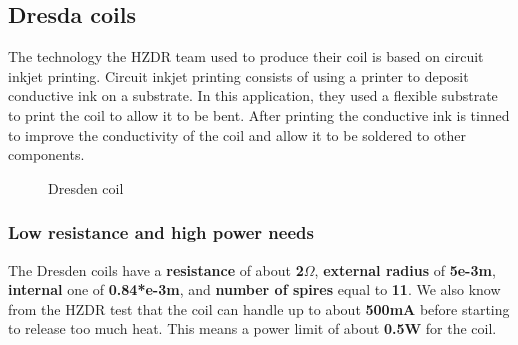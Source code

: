 \subsection{Dresda coils}
The technology the HZDR team used to produce their coil is based on circuit inkjet printing.
Circuit inkjet printing consists of using a printer to deposit conductive ink on a substrate.
In this application, they used a flexible substrate to print the coil to allow it to be bent.
After printing the conductive ink is tinned to improve the conductivity of the coil and allow it to be soldered to other components.
\begin{figure}
    \centering
    \caption{Dresden coil \cite{HZDR}}
    \label{fig:Dresden_coil}
\end{figure}

\subsubsection{Low resistance and high power needs}
The Dresden coils have a \textbf{resistance} of about \textbf{2$\Omega$}, \textbf{external radius} of \textbf{5e-3m}, \textbf{internal} one of \textbf{0.84*e-3m}, and \textbf{number of spires} equal to \textbf{11}.
We also know from the HZDR test that the coil can handle up to about \textbf{500mA} before starting to release too much heat.
This means a power limit of about \textbf{0.5W} for the coil.

